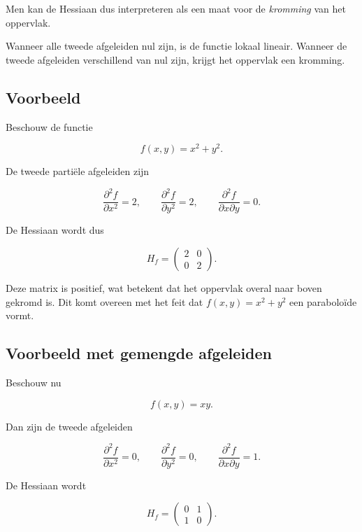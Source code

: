 \documentclass[11pt,a4paper]{article}
\begin{document}
    Men kan de Hessiaan dus interpreteren als een maat voor de
    \textit{kromming} van het oppervlak.

    Wanneer alle tweede afgeleiden nul zijn, is de functie lokaal
    lineair. Wanneer de tweede afgeleiden verschillend van nul zijn,
    krijgt het oppervlak een kromming.

    \subsection{Voorbeeld}

    Beschouw de functie

    \[
        f(x,y) = x^2 + y^2.
    \]

    De tweede partiële afgeleiden zijn

    \[
        \frac{\partial^2 f}{\partial x^2} = 2,
        \qquad
        \frac{\partial^2 f}{\partial y^2} = 2,
        \qquad
        \frac{\partial^2 f}{\partial x \partial y} = 0.
    \]

    De Hessiaan wordt dus

    \[
        H_f =
        \begin{pmatrix}
            2 & 0 \\
            0 & 2
        \end{pmatrix}.
    \]

    Deze matrix is positief, wat betekent dat het oppervlak overal
    naar boven gekromd is. Dit komt overeen met het feit dat
    $f(x,y) = x^2 + y^2$ een paraboloïde vormt.

    \subsection{Voorbeeld met gemengde afgeleiden}

    Beschouw nu

    \[
        f(x,y) = xy.
    \]

    Dan zijn de tweede afgeleiden

    \[
        \frac{\partial^2 f}{\partial x^2} = 0,
        \qquad
        \frac{\partial^2 f}{\partial y^2} = 0,
        \qquad
        \frac{\partial^2 f}{\partial x \partial y} = 1.
    \]

    De Hessiaan wordt

    \[
        H_f =
        \begin{pmatrix}
            0 & 1 \\
            1 & 0
        \end{pmatrix}.
    \]
\end{document}
